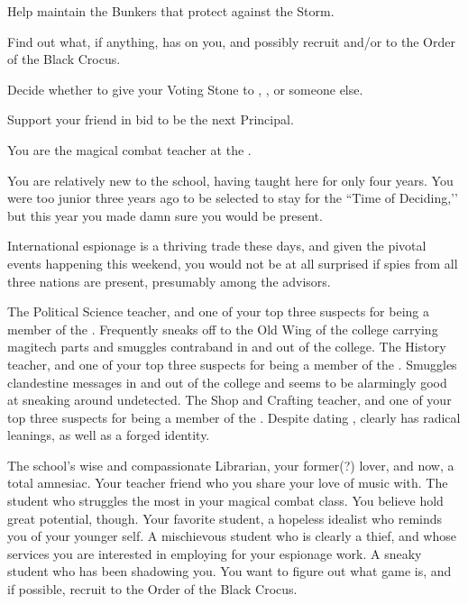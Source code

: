 \documentclass[char]{GL2020}
\begin{document}
\begin{itemz}
    \item Help \cBunker{} maintain the Bunkers that protect against the Storm.
    \item Find out what, if anything, \cLibAssist{} has on you, and possibly recruit \cLibAssist{\them} and/or \cPirateChild{} to the Order of the Black Crocus.
    \item Decide whether to give your Voting Stone to \cAdopted{}, \cDisney{}, or someone else.
    \item Support your friend \cMusic{} in \cMusic{\their} bid to be the next Principal.
\end{itemz}

\begin{itemz}[Notes]
    \item You are the magical combat teacher at the \pSchool{}.
    \item You are relatively new to the school, having taught here for only four years. You were too junior three years ago to be selected to stay for the ``Time of Deciding,’’ but this year you made damn sure you would be present.
    \item International espionage is a thriving trade these days, and given the pivotal events happening this weekend, you would not be at all surprised if spies from all three nations are present, presumably among the advisors.
\end{itemz}

\begin{contacts}[Suspects]
    \contact{\cChupInventor{}} The Political Science teacher, and one of your top three suspects for being a member of the \pGoaties{}. Frequently sneaks off to the Old Wing of the college carrying magitech parts and smuggles contraband in and out of the college.
    \contact{\cHistory{}} The History teacher, and one of your top three suspects for being a member of the \pGoaties{}. Smuggles clandestine messages in and out of the college and seems to be alarmingly good at sneaking around undetected.
    \contact{\cPirate{}} The Shop and Crafting teacher, and one of your top three suspects for being a member of the \pGoaties{}. Despite dating \cPrince{\full}, \cPirate{} clearly has radical leanings, as well as a forged identity.
\end{contacts}

\begin{contacts}
    \contact{\cLibrarian{}} The school’s wise and compassionate Librarian, your former(?) lover, and now, a total amnesiac. 
    \contact{\cMusic{}} Your teacher friend who you share your love of music with.
    \contact{\cAdopted{}} The student who struggles the most in your magical combat class. You believe \cAdopted{\they} hold\cAdopted{\verbs} great potential, though.
    \contact{\cDisney{}} Your favorite student, a hopeless idealist who reminds you of your younger self.
    \contact{\cPirateChild{}} A mischievous student who is clearly a thief, and whose services you are interested in employing for your espionage work.
    \contact{\cLibAssist{}} A sneaky student who has been shadowing you. You want to figure out what \cLibAssist{\their} game is, and if possible, recruit \cLibAssist{\them} to the Order of the Black Crocus.
\end{contacts}
\end{document}
